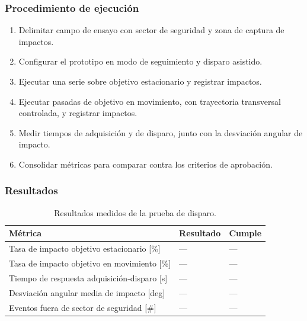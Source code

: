 \subsubsection{Procedimiento de ejecución}

\begin{enumerate}
    \item Delimitar campo de ensayo con sector de seguridad y zona de captura de impactos.
    \item Configurar el prototipo en modo de seguimiento y disparo asistido.
    \item Ejecutar una serie sobre objetivo estacionario y registrar impactos.
    \item Ejecutar pasadas de objetivo en movimiento, con trayectoria transversal controlada, y registrar impactos.
    \item Medir tiempos de adquisición y de disparo, junto con la desviación angular de impacto.
    \item Consolidar métricas para comparar contra los criterios de aprobación.
\end{enumerate}

\subsubsection{Resultados}

\begin{table}[H]
\centering
\small
\begin{tabular}{p{8.8cm} p{2.2cm} p{2.8cm}}
\toprule
\textbf{Métrica} & \textbf{Resultado} & \textbf{Cumple} \\
\midrule
Tasa de impacto objetivo estacionario [\%] & --- & --- \\
Tasa de impacto objetivo en movimiento [\%] & --- & --- \\
Tiempo de respuesta adquisición-disparo [s] & --- & --- \\
Desviación angular media de impacto [deg] & --- & --- \\
Eventos fuera de sector de seguridad [\#] & --- & --- \\
\bottomrule
\end{tabular}
\caption{Resultados medidos de la prueba de disparo.}
\label{tab:resultados_prueba_disparo}
\end{table}
